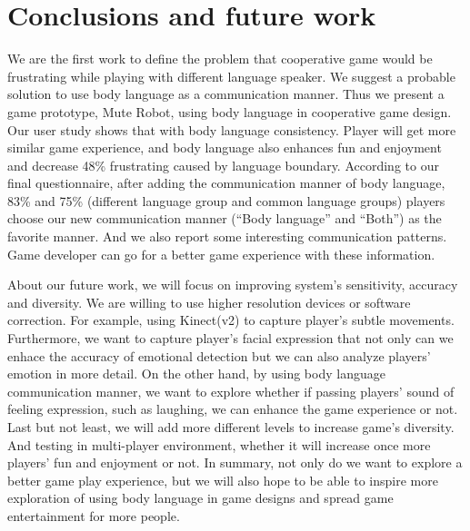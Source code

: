 \section{Conclusions and future work}



We are the first work to define the problem that cooperative game would be frustrating while playing with different language speaker. We suggest a probable solution to use body language as a communication manner. Thus we present a game prototype, Mute Robot, using body language in cooperative game design. Our user study shows that with body language consistency. Player will get more similar game experience, and body language also enhances fun and enjoyment and decrease 48\% frustrating caused by language boundary. According to our final questionnaire, 
after adding the communication manner of body language, 83\% and 75\% (different language group and common language groups) players choose our new communication manner (``Body language'' and ``Both'') as the favorite manner. 
And we also report some interesting communication patterns. Game developer can go for a better game experience with these information.

About our future work, we will focus on improving system's sensitivity, accuracy and diversity. We are willing to use higher resolution devices or software correction. For example, using Kinect(v2) to capture player's subtle movements. Furthermore, we want to capture player's facial expression that not only can we enhace the accuracy of emotional detection but we can also analyze players' emotion in more detail.
On the other hand, by using body language communication manner, we want to explore whether if passing players' sound of feeling expression, such as laughing, we can enhance the game experience or not. Last but not least, we will add more different levels to increase game's diversity. And testing in multi-player environment, whether it will increase once more players' fun and enjoyment or not. In summary, not only do we want to explore a better game play experience, but we will also hope to be able to inspire more exploration of using body language in game designs and spread game entertainment for more people.


